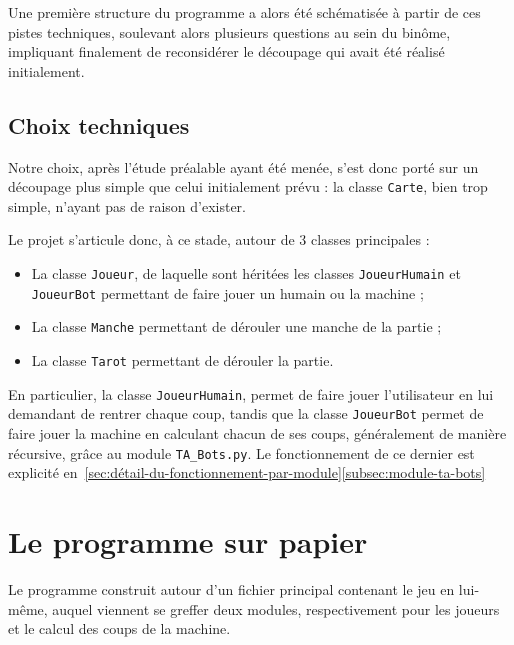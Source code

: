       Une première structure du programme a alors été schématisée à partir de ces pistes techniques, soulevant alors plusieurs questions au sein du binôme, impliquant finalement de reconsidérer le découpage qui avait été réalisé initialement.

   \subsection{Choix techniques}\label{subsec:choix-techniques}
      Notre choix, après l'étude préalable ayant été menée, s'est donc porté sur un découpage plus simple que celui initialement prévu : la classe \texttt{Carte}, bien trop simple, n'ayant pas de raison d'exister.

      Le projet s'articule donc, à ce stade, autour de 3 classes principales :
      \begin{itemize}
         \item La classe \texttt{Joueur}, de laquelle sont héritées les classes \texttt{JoueurHumain} et \texttt{JoueurBot} permettant de faire jouer un humain ou la machine ;
         \item La classe \texttt{Manche} permettant de dérouler une manche de la partie ;
         \item La classe \texttt{Tarot} permettant de dérouler la partie.
      \end{itemize}

      En particulier, la classe \texttt{JoueurHumain}, permet de faire jouer l'utilisateur en lui demandant de rentrer chaque coup, tandis que la classe \texttt{JoueurBot} permet de faire jouer la machine en calculant chacun de ses coups, généralement de manière récursive, grâce au module \texttt{TA\_Bots.py}.
      Le fonctionnement de ce dernier est explicité en~\ref{sec:détail-du-fonctionnement-par-module}\ref{subsec:module-ta-bots}


\section{Le programme sur papier}\label{sec:le-programme-sur-papier}
   Le programme construit autour d'un fichier principal contenant le jeu en lui-même, auquel viennent se greffer deux modules, respectivement pour les joueurs et le calcul des coups de la machine.

